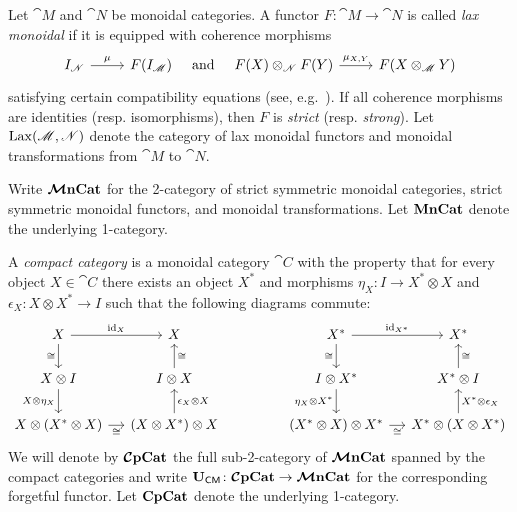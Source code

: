 \documentclass[11pt,oneside,article]{memoir}
\begin{document}
Let $\cat{M}$ and $\cat{N}$ be monoidal categories. A functor $F\colon\cat{M}\to\cat{N}$ is called \emph{lax monoidal} if it is equipped with coherence morphisms
\begin{equation*} \begin{tikzcd}
      I_{\cat{N}} \rar{\mu} & F(I_{\cat{M}})
\end{tikzcd}
\quad\text{and}\quad 
\begin{tikzcd}
      F(X) \otimes_{\cat{N}} F(Y) \rar{\mu_{X,Y}} & F(X\otimes_{\cat{M}} Y)
\end{tikzcd} \end{equation*}
satisfying certain compatibility equations (see, e.g.\ \cite{Leinster,BorceuxV2}). If all coherence morphisms are identities (resp. isomorphisms), then $F$ is \emph{strict} (resp. \emph{strong}). Let $\operatorname{Lax}(\mathscr{M},\mathscr{N})$ denote the category of lax monoidal functors and monoidal transformations from $\cat{M}$ to $\cat{N}$.

Write $\bm{\mathcal{M}}\mathbf{nCat}$ for the 2-category of strict symmetric monoidal categories, strict symmetric
monoidal functors, and monoidal transformations. Let $\mathbf{MnCat}$ denote the underlying 1-category.

A \emph{compact category} is a monoidal category $\cat{C}$ with the property that for every
object $X\in\cat{C}$ there exists an object $X^*$ and morphisms $\eta_X\colon I\to X^*\otimes X$ and
$\epsilon_X\colon X\otimes X^*\to I$ such that the following diagrams commute:
\begin{equation*}
   \begin{tikzcd}[column sep=small]
      X\arrow[r,"\id_X"]\arrow[d,"\cong"'] & X \\
      X\otimes I\arrow[d,"X\otimes\eta_X"'] & I\otimes X\arrow[u,"\cong"'] \\
      X\otimes(X^*\otimes X)\arrow[r,"\cong"'] & (X\otimes X^*)\otimes X\arrow[u,"\epsilon_X\otimes X"']
   \end{tikzcd}
   \hspace{.6in}
   \begin{tikzcd}[column sep=small]
      X^*\arrow[r,"\id_{X^*}"]\arrow[d,"\cong"'] & X^*\\
      I\otimes X^*\arrow[d,"\eta_X\otimes X^*"'] & X^*\otimes I\arrow[u,"\cong"'] \\
      (X^*\otimes X)\otimes X^*\arrow[r,"\cong"'] & X^*\otimes (X\otimes X^*)\arrow[u,"X^*\otimes\epsilon_X"']
   \end{tikzcd}
\end{equation*}
We will denote by $\bm{\mathcal{C}}\mathbf{pCat}$ the full sub-2-category of $\bm{\mathcal{M}}\mathbf{nCat}$ spanned by the compact categories and write $\mathbf{U}_{\mathsf{CM}}\colon\bm{\mathcal{C}}\mathbf{pCat}\to\bm{\mathcal{M}}\mathbf{nCat}$ for the corresponding forgetful functor. Let $\mathbf{CpCat}$ denote the underlying 1-category.
\end{document}
